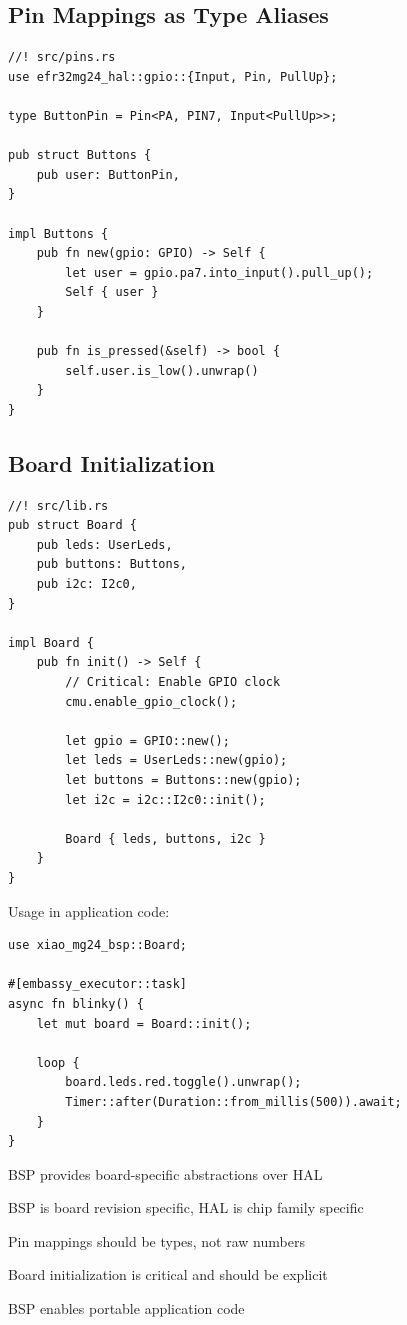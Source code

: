 \subsection{Pin Mappings as Type Aliases}
\label{subsec:pin-mappings}

\begin{verbatim}
//! src/pins.rs
use efr32mg24_hal::gpio::{Input, Pin, PullUp};

type ButtonPin = Pin<PA, PIN7, Input<PullUp>>;

pub struct Buttons {
    pub user: ButtonPin,
}

impl Buttons {
    pub fn new(gpio: GPIO) -> Self {
        let user = gpio.pa7.into_input().pull_up();
        Self { user }
    }
    
    pub fn is_pressed(&self) -> bool {
        self.user.is_low().unwrap()
    }
}
\end{verbatim}

\subsection{Board Initialization}
\label{subsec:board-init}

\begin{verbatim}
//! src/lib.rs
pub struct Board {
    pub leds: UserLeds,
    pub buttons: Buttons,
    pub i2c: I2c0,
}

impl Board {
    pub fn init() -> Self {
        // Critical: Enable GPIO clock
        cmu.enable_gpio_clock();
        
        let gpio = GPIO::new();
        let leds = UserLeds::new(gpio);
        let buttons = Buttons::new(gpio);
        let i2c = i2c::I2c0::init();
        
        Board { leds, buttons, i2c }
    }
}
\end{verbatim}

\begin{example}
Usage in application code:
\end{example}

\begin{verbatim}
use xiao_mg24_bsp::Board;

#[embassy_executor::task]
async fn blinky() {
    let mut board = Board::init();
    
    loop {
        board.leds.red.toggle().unwrap();
        Timer::after(Duration::from_millis(500)).await;
    }
}
\end{verbatim}

\begin{keytakeaways}
    \item BSP provides board-specific abstractions over HAL
    \item BSP is board revision specific, HAL is chip family specific
    \item Pin mappings should be types, not raw numbers
    \item Board initialization is critical and should be explicit
    \item BSP enables portable application code
\end{keytakeaways}

